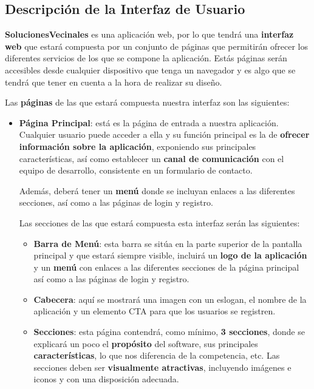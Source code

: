 \begin{appendices}
	
\section{Descripción de la Interfaz de Usuario}
\label{sec:apenA}
\textbf{SolucionesVecinales} es una aplicación web, por lo que tendrá una \textbf{interfaz web} que estará compuesta por un conjunto de páginas que permitirán ofrecer los diferentes servicios de los que se compone la aplicación. Estás páginas serán accesibles desde cualquier dispositivo que tenga un navegador y es algo que se tendrá que tener en cuenta a la hora de realizar su diseño. 

Las \textbf{páginas} de las que estará compuesta nuestra interfaz son las siguientes:

\begin{itemize}
	\item \textbf{Página Principal}: está es la página de entrada a nuestra aplicación. Cualquier usuario puede acceder a ella y  su función principal es la de \textbf{ofrecer información sobre la aplicación}, exponiendo sus principales características, así como establecer un \textbf{canal de comunicación} con el equipo de desarrollo, consistente en un formulario de contacto.
	  
	Además, deberá tener un \textbf{menú} donde se incluyan enlaces a las diferentes secciones, así como a las páginas de login y registro.
	
	Las secciones de las que estará compuesta esta interfaz serán las siguientes:
	
	\begin{itemize}
		\item \textbf{Barra de Menú}: esta barra se sitúa en la parte superior de la pantalla principal y que estará siempre visible, incluirá un \textbf{logo de la aplicación} y un \textbf{menú} con enlaces a las diferentes secciones de la página principal así como a las páginas de login y registro.
		
		\item \textbf{Cabecera}: aquí se mostrará una imagen con un eslogan, el nombre de la aplicación y un elemento \gls{CTA} para que los usuarios se registren.
		
		\item \textbf{Secciones}: esta página contendrá, como mínimo, \textbf{3 secciones}, donde se explicará un poco el \textbf{propósito} del software, sus principales \textbf{características}, lo que nos diferencia de la competencia, etc. Las secciones deben ser \textbf{visualmente atractivas}, incluyendo imágenes e iconos y con una disposición adecuada. 
		

\end{itemize}
\end{itemize}
\end{appendices}
